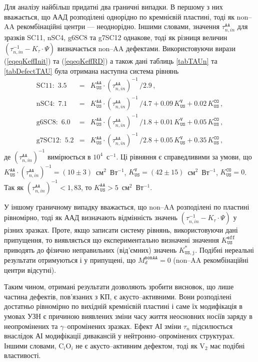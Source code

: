 Для аналізу найбільш придатні два граничні випадки.
В першому з них вважається,
що ААД розподілені однорідно по кремнієвій пластині, тоді як
non--AA рекомбінаційні центри --- неоднорідно.
Іншими словами,
значення $\tau_{n,in}^\mathtt{AA}$ для зразків SC11, nSC4, g6SC8 та g7SC12
однакове, тоді як різниця величин
$(\tau_{n,in}^{-1}-K_\tau\cdot\Psi)$ визначається non--AA дефектами.
Використовуючи вирази (\ref{eqeqKeffInit}) та (\ref{eqeqKeffRD}) а також
дані таблиць \ref{tabTAUn} та \ref{tabDefectTAU}
була отримана наступна система рівнянь
\begin{eqnarray}
\mbox{SC11}:\,\,3.5&=&K_\mathtt{US}^\mathtt{AA}\cdot(\tau_{n,in}^\mathtt{AA})^{-1}\,/2.9\,,\nonumber\\
\mbox{nSC4}:\,\,7.1&=&K_\mathtt{US}^\mathtt{AA}\cdot(\tau_{n,in}^\mathtt{AA})^{-1}\,/4.7+0.09\,K_\mathtt{US}^\mathtt{V}+0.02\,K_\mathtt{US}^\mathtt{CO}\,,\nonumber\\
\mbox{g6SC8}:\,\,6.0&=&K_\mathtt{US}^\mathtt{AA}\cdot(\tau_{n,in}^\mathtt{AA})^{-1}\,/1.8+0.01\,K_\mathtt{US}^\mathtt{V}+0.05\,K_\mathtt{US}^\mathtt{CO}\,,\nonumber\\
\mbox{g7SC12}:\,\,5.2&=&K_\mathtt{US}^\mathtt{AA}\cdot(\tau_{n,in}^\mathtt{AA})^{-1}\,/2.8+0.05\,K_\mathtt{US}^\mathtt{V}+0.35\,K_\mathtt{US}^\mathtt{CO}\,,\nonumber
\end{eqnarray}
де
$(\tau_{n,in}^\mathtt{AA})^{-1}$ вимірюється в $10^4$~с$^{-1}$.
Ці рівняння є справедливими за умови, що
$K_\mathtt{US}^\mathtt{AA}\cdot(\tau_{n,in}^\mathtt{AA})^{-1}=(10\pm3)$~см$^2$~Вт$^{-1}$,
$K_\mathtt{US}^\mathtt{V}=(42\pm15)$~см$^2$~Вт$^{-1}$,
$K_\mathtt{US}^\mathtt{CO}=0$.
Так як  $(\tau_{n,in}^\mathtt{AA})^{-1}<1,83$,
то $K_\mathtt{US}^\mathtt{AA}>5$~см$^2$~Вт$^{-1}$.

У іншому граничному випадку вважається,
що non--AA розподілені по пластині рівномірно,
тоді як ААД визначають відмінність значень $(\tau_{n,in}^{-1}-K_\tau\cdot\Psi)$ у різних зразках.
Проте, якщо записати систему рівнянь, використовуючи дані припущення,
то виявляється що експериментально визначені значення $K_\mathtt{US}^\mathtt{eff}$
приводять до фізично неправильних (від'ємних) значень $K_\mathtt{US,j}^*$.
Подібні нереальні результати отримуються і у припущені, що $M_d^\mathtt{nonAA}=0$
(non--AA рекомбінаційні центри відсутні).

Таким чином, отримані результати дозволяють зробити висновок,
що лише частина дефектів, пов'язаних з КП, є акусто--активними.
Вони розподілені достатньо рівномірно по вихідній кремнієвій пластині і саме їх модифікація
в умовах УЗН є причиною виявлених зміни часу життя неосновних носіїв заряду в неопромінених та $\gamma$--опромінених зразках.
Ефект АІ зміни $\tau_n$ підсилюється внаслідок АІ модифікації дивакансій у нейтронно--опромінених структурах.
Іншими словами,
C$_i$O$_i$ не є акусто--активним дефектом, тоді як V$_2$ має подібні властивості.



